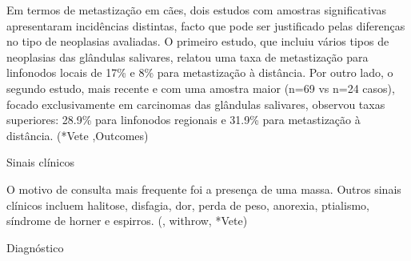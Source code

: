 Em termos de metastização em cães, dois estudos com amostras significativas apresentaram incidências distintas, facto que pode ser justificado pelas diferenças no tipo de neoplasias avaliadas. O primeiro estudo, que incluiu vários tipos de neoplasias das glândulas salivares, relatou uma taxa de metastização para linfonodos locais de 17\% e 8\% para metastização à distância. Por outro lado, o segundo estudo, mais recente e com uma amostra maior (n=69 vs n=24 casos), focado exclusivamente em carcinomas das glândulas salivares, observou taxas superiores: 28.9\% para linfonodos regionais e 31.9\% para metastização à distância. (*Vete ,Outcomes)


Sinais clínicos


O motivo de consulta mais frequente foi a presença de uma massa. Outros sinais clínicos incluem halitose, disfagia, dor, perda de peso, anorexia, ptialismo, síndrome de horner e espirros. (\cite{Dobson2011}, withrow, *Vete) 


Diagnóstico


